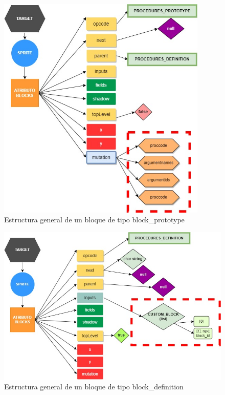 \documentclass[a4paper, 12pt]{book}
\begin{document}
\begin{figure}[!htb]
  \centering
  \includegraphics[width=10cm, keepaspectratio]{img/block_prototype.jpg}
  \caption{Estructura general de un bloque de tipo block\_prototype}
  \label{fig:block_prototype}
\end{figure}

\begin{figure}[!htb]
  \centering
  \includegraphics[width=13cm, keepaspectratio]{img/block_definition.jpg}
  \caption{Estructura general de un bloque de tipo block\_definition}
  \label{fig:block_definition}
\end{figure}
\end{document}
